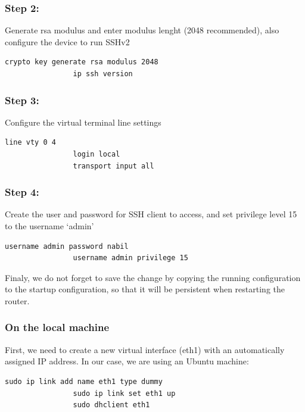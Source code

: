 \subsubsection{Step 2:}
Generate rsa modulus and enter modulus lenght (2048 recommended), also configure the device to run SSHv2
\begin{lstlisting}[style=xmlStyle,  backgroundcolor=\color{codebackground}]
                crypto key generate rsa modulus 2048 
                ip ssh version 
\end{lstlisting}

\subsubsection{Step 3:}
Configure the virtual terminal line settings
\begin{lstlisting}[style=xmlStyle,  backgroundcolor=\color{codebackground}]
                line vty 0 4 
                login local
                transport input all
\end{lstlisting}

\subsubsection{Step 4:}
Create the user and password for SSH client to access, and set privilege level 15 to the username ‘admin’
\begin{lstlisting}[style=xmlStyle,  backgroundcolor=\color{codebackground}]
                username admin password nabil 
                username admin privilege 15 
\end{lstlisting}

\indent Finaly, we do not forget to save the change by copying the running configuration to the startup configuration, so that it will be persistent when restarting the router.

\subsubsection{On the local machine}

\indent First, we need to create a new virtual interface (eth1) with an automatically assigned IP address. In our case, we are using an Ubuntu machine:
\begin{lstlisting}[style=xmlStyle,  backgroundcolor=\color{codebackground}]
                sudo ip link add name eth1 type dummy
                sudo ip link set eth1 up
                sudo dhclient eth1
\end{lstlisting}

